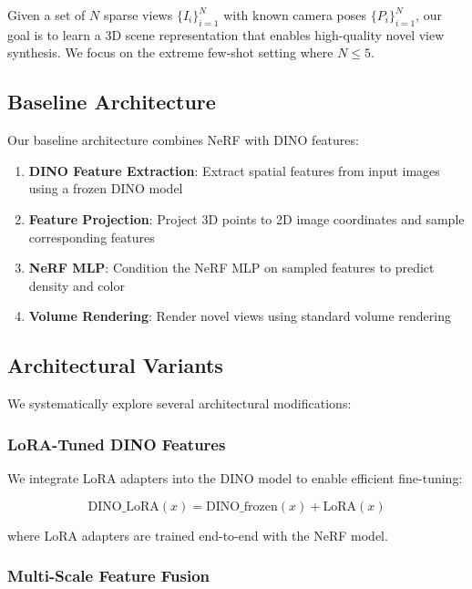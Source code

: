 \documentclass[11pt]{article}
\begin{document}
Given a set of $N$ sparse views $\{I_i\}_{i=1}^N$ with known camera poses $\{P_i\}_{i=1}^N$, our goal is to learn a 3D scene representation that enables high-quality novel view synthesis. We focus on the extreme few-shot setting where $N \leq 5$.

\subsection{Baseline Architecture}

Our baseline architecture combines NeRF with DINO features:

\begin{enumerate}
    \item \textbf{DINO Feature Extraction}: Extract spatial features from input images using a frozen DINO model
    \item \textbf{Feature Projection}: Project 3D points to 2D image coordinates and sample corresponding features
    \item \textbf{NeRF MLP}: Condition the NeRF MLP on sampled features to predict density and color
    \item \textbf{Volume Rendering}: Render novel views using standard volume rendering
\end{enumerate}

\subsection{Architectural Variants}

We systematically explore several architectural modifications:

\subsubsection{LoRA-Tuned DINO Features}

We integrate LoRA adapters into the DINO model to enable efficient fine-tuning:

\begin{equation}
\text{DINO\_LoRA}(x) = \text{DINO\_frozen}(x) + \text{LoRA}(x)
\end{equation}

where LoRA adapters are trained end-to-end with the NeRF model.

\subsubsection{Multi-Scale Feature Fusion}
\end{document}
